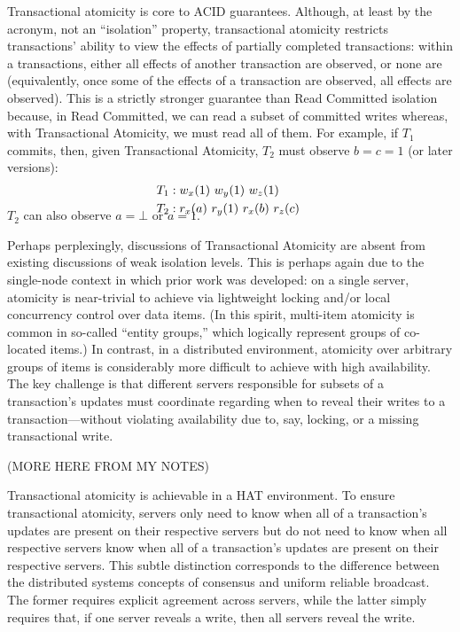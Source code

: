 Transactional atomicity is core to ACID guarantees. Although, at least
by the acronym, not an ``isolation'' property, transactional atomicity
restricts transactions' ability to view the effects of partially
completed transactions: within a transactions, either all effects of
another transaction are observed, or none are (equivalently, once some
of the effects of a transaction are observed, all effects are
observed). This is a strictly stronger guarantee than Read Committed
isolation because, in Read Committed, we can read a subset of
committed writes whereas, with Transactional Atomicity, we must read
all of them. For example, if $T_1$ commits, then, given Transactional
Atomicity, $T_2$ must observe $b=c=1$ (or later versions):
\vspace{-.5em}
\begin{align*}
\small
T_1 &: w_x(1)~w_y(1)~w_z(1)
\\T_2 &: r_x(a)~r_y(1)~r_x(b)~r_z(c)~\\[-1.5em]
\end{align*}
$T_2$ can also observe $a=\bot$ or $a=1$.

Perhaps perplexingly, discussions of Transactional Atomicity are
absent from existing discussions of weak isolation levels. This is
perhaps again due to the single-node context in which prior work was
developed: on a single server, atomicity is near-trivial to achieve
via lightweight locking and/or local concurrency control over data
items. (In this spirit, multi-item atomicity is common in so-called
``entity groups,'' which logically represent groups of co-located
items.) In contrast, in a distributed environment, atomicity over
arbitrary groups of items is considerably more difficult to achieve
with high availability. The key challenge is that different servers
responsible for subsets of a transaction's updates must coordinate
regarding when to reveal their writes to a transaction---without
violating availability due to, say, locking, or a missing
transactional write.

(MORE HERE FROM MY NOTES)

Transactional atomicity is achievable in a HAT environment. To ensure
transactional atomicity, servers only need to know when all of a
transaction's updates are present on their respective servers but do
not need to know when all respective servers know when all of a
transaction's updates are present on their respective servers. This
subtle distinction corresponds to the difference between the
distributed systems concepts of consensus and uniform reliable
broadcast. The former requires explicit agreement across servers,
while the latter simply requires that, if one server reveals a write,
then all servers reveal the write.


